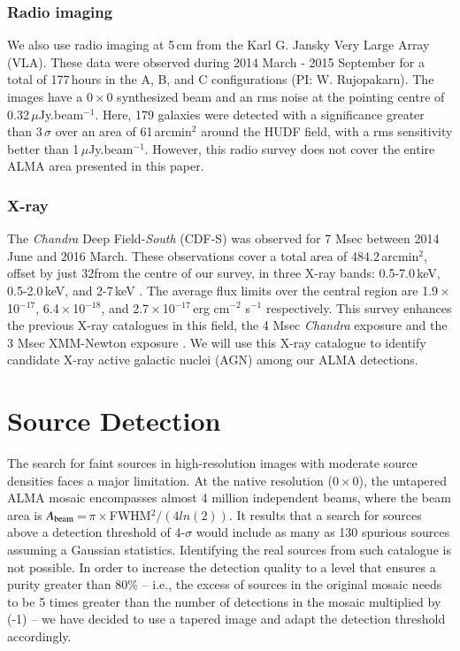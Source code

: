 \documentclass[longauth]{aa}
\begin{document}
\subsubsection{Radio imaging}
We also use radio imaging at 5\,cm from the Karl G. Jansky Very Large Array (VLA). These data were observed during 2014 March - 2015 September for a total of 177\,hours in the A, B, and C configurations (PI: W. Rujopakarn). The images have a 0\,$\times$\,0 synthesized beam and an rms noise at the pointing centre of 0.32\,$\mu$Jy.beam$^{-1}$\citep{Rujopakarn2016}. Here, 179 galaxies were detected with a significance greater than 3\,$\sigma$ over an area of 61\,arcmin$^2$ around the HUDF field, with a rms sensitivity better than 1\,$\mu$Jy.beam$^{-1}$. However, this radio survey does not cover the entire ALMA area presented in this paper.


\subsubsection{X-ray}
The \textit{Chandra} Deep Field-\textit{South} (CDF-S) was observed for 7 Msec between 2014 June and 2016 March. These observations cover a total area of 484.2\,arcmin$^2$, offset by just 32\arcsec from the centre of our survey, in three X-ray bands: 0.5-7.0\,keV, 0.5-2.0\,keV, and 2-7\,keV \citep{Luo2017}. The average flux limits over the central region are 1.9\,$\times$\,10$^{-17}$, 6.4\,$\times$\,10$^{-18}$, and 2.7\,$\times$\,10$^{-17}$\,erg cm$^{-2}$ s$^{-1}$ respectively. This survey enhances the previous X-ray catalogues in this field, the 4 Msec \textit{Chandra} exposure \citep{Xue2011} and the 3 Msec XMM-Newton exposure \citep{Ranalli2013}. We will use this X-ray catalogue to identify candidate X-ray active galactic nuclei (AGN) among our ALMA detections.


\section{Source Detection}\label{sec:Source_Detection}
The search for faint sources in high-resolution images with moderate source densities faces a major limitation. At the native resolution (0\,$\times$\,0), the untapered ALMA mosaic encompasses almost 4 million independent beams, where the beam area is $A_{\rm beam}$\,=\,$\pi$\,$\times$\,FWHM$^2/(4ln(2))$. It results that a search for sources above a detection threshold of 4-$\sigma$ would include as many as 130 spurious sources assuming a Gaussian statistics.
Identifying the real sources from such catalogue is not possible. In order to increase the detection quality to a level that ensures a purity greater than 80\% -- i.e., the excess of sources in the original mosaic needs to be 5 times greater than the number of detections in the mosaic multiplied by (-1) -- we have decided to use a tapered image and adapt the detection threshold accordingly.
\end{document}
